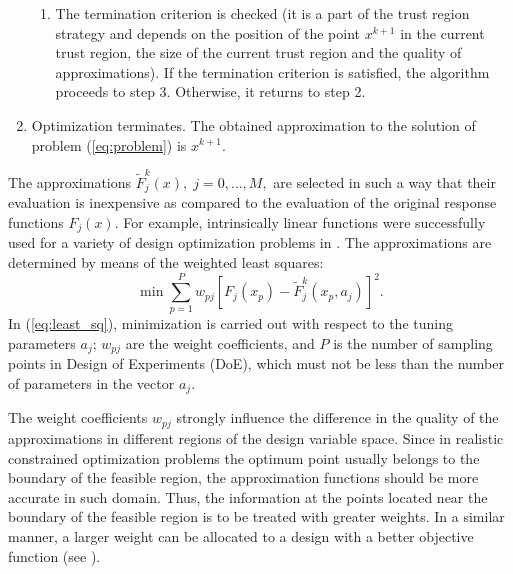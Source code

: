 \documentclass[runningheads,a4paper]{llncs}
\begin{document}
\begin{enumerate}
\begin{enumerate}[label=(\alph*)]
    \item The termination criterion is checked (it is a part of the
        trust region strategy and depends on the position of the point
        $ x^{k+1}$ in the current trust region, the size of the current
        trust region and the quality of approximations). If the
        termination criterion is satisfied, the algorithm proceeds to
        step 3. Otherwise, it returns to step 2.
  \end{enumerate}
  \item Optimization terminates. The obtained approximation to the solution
      of problem (\ref{eq:problem}) is $ x^{k+1}$.
\end{enumerate}

The approximations $\widetilde{F}^k_j(x),\; j=0, \dots ,M,$ are selected in
such a way that their evaluation is inexpensive as compared to the evaluation
of the original response functions $F_j(x)$. For example, intrinsically linear
functions were successfully used for a variety of design optimization problems
in \cite{ToropovFilatov1993,KeulenToropov1997}. The approximations are
determined by means of the weighted least squares:
\begin{equation}\label{eq:least_sq}
\min \sum_{p=1}^P{w_{pj}\left[ F_j(x_p)- \widetilde{F}^k_j(x_p,a_j) \right]^2}.
\end{equation}
In (\ref{eq:least_sq}), minimization is carried out with respect to the tuning
parameters $a_j$; $w_{pj}$ are the weight coefficients, and $P$ is the number
of sampling points in Design of Experiments (DoE), which must not be less than
the number of parameters in the vector $a_j$.

The weight coefficients $w_{pj}$ strongly influence the difference in the
quality of the approximations in different regions of the design variable
space. Since in realistic constrained optimization problems the optimum point
usually belongs to the boundary of the feasible region, the approximation
functions should be more accurate in such domain. Thus, the information at the
points located near the boundary of the feasible region is to be treated with
greater weights. In a similar manner, a larger weight can be allocated to a
design with a better objective function (see
\cite{ToropovFilatov1993,KeulenToropov1997}).
\end{document}
